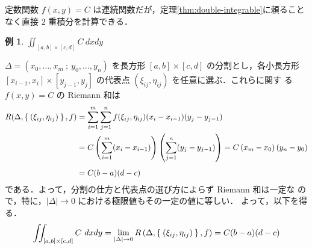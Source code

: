 \documentclass[10pt, uplatex, dvipdfmx]{jsarticle}
\theoremstyle{definition}
\newtheorem{example}[theorem]{例}
\numberwithin{equation}{section}
\newcommand{\ds}{\displaystyle}
\begin{document}
\newpage

定数関数 $f(x,y) = C$ は連続関数だが，定理\ref{thm:double-integrable}に頼ることなく直接 $2$ 重積分を計算できる．\\

\begin{example}
  $\ds \iint_{[a,b]\times [c,d]}C \ dx dy$

  \vspace{1zh}

  $\Delta=(x_0, \ldots, x_m \ ;\  y_0, \ldots, y_n)$ を長方形
  $[a,b] \times [c,d]$ の分割とし，各小長方形
  $[x_{i-1}, x_{i}] \times [y_{j-1}, y_{j}]$ の代表点
  $\left( \xi_{ij}, \eta_{ij}\right)$ を任意に選ぶ．これらに関す
  る $f(x,y) =C$ の Riemann 和は
  \[
    \begin{aligned}
      R(\Delta, \Set{(\xi_{ij}, \eta_{ij})}, f)
      &= \sum_{i=1}^{m} \sum_{j=1}^{n} f(\xi_{ij}, \eta_{ij}) (x_{i}-x_{i-1})(y_{j}-y_{j-1})\\
      &= C \left( \sum_{i=1}^{m} (x_{i}-x_{i-1}) \right) \left(\sum_{j=1}^{n} (y_{j}-y_{j-1})\right)
        = C \left( x_{m} - x_{0} \right) \left( y_{n} - y_{0}\right)\\[1ex]
      &= C(b-a)(d-c)
    \end{aligned}
  \]
  である．よって，分割の仕方と代表点の選び方によらず Riemann 和は一定な
  ので，特に，$|\Delta | \to 0$ における極限値もその一定の値に等しい．
  よって，以下を得る．
  \[
    \iint_{[a,b] \times [c,d]} C \ dx dy = \lim_{|\Delta|
      \to 0} R\left(\Delta, \Set{\left(\xi_{ij}, \eta_{ij}\right)}, f\right) =
    C(b-a)(d-c)
  \]
\end{example}
\end{document}
